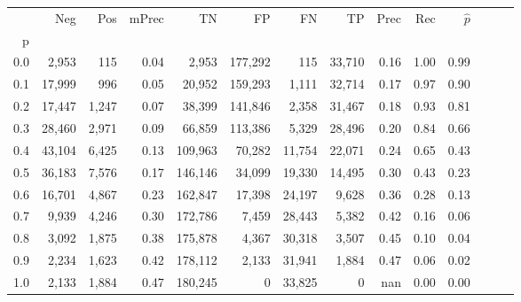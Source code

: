 \begin{tabular}{rrrrrrrrrrrrrr}
\toprule
{} &     Neg &    Pos & mPrec &       TN &       FP &      FN &      TP &  Prec &   Rec & $\hat{p}$ \\
p   &         &        &       &          &          &         &         &       &       &           \\
\midrule
0.0 &   2,953 &    115 &  0.04 &    2,953 &  177,292 &     115 &  33,710 &  0.16 &  1.00 &      0.99 \\
0.1 &  17,999 &    996 &  0.05 &   20,952 &  159,293 &   1,111 &  32,714 &  0.17 &  0.97 &      0.90 \\
0.2 &  17,447 &  1,247 &  0.07 &   38,399 &  141,846 &   2,358 &  31,467 &  0.18 &  0.93 &      0.81 \\
0.3 &  28,460 &  2,971 &  0.09 &   66,859 &  113,386 &   5,329 &  28,496 &  0.20 &  0.84 &      0.66 \\
0.4 &  43,104 &  6,425 &  0.13 &  109,963 &   70,282 &  11,754 &  22,071 &  0.24 &  0.65 &      0.43 \\
0.5 &  36,183 &  7,576 &  0.17 &  146,146 &   34,099 &  19,330 &  14,495 &  0.30 &  0.43 &      0.23 \\
0.6 &  16,701 &  4,867 &  0.23 &  162,847 &   17,398 &  24,197 &   9,628 &  0.36 &  0.28 &      0.13 \\
0.7 &   9,939 &  4,246 &  0.30 &  172,786 &    7,459 &  28,443 &   5,382 &  0.42 &  0.16 &      0.06 \\
0.8 &   3,092 &  1,875 &  0.38 &  175,878 &    4,367 &  30,318 &   3,507 &  0.45 &  0.10 &      0.04 \\
0.9 &   2,234 &  1,623 &  0.42 &  178,112 &    2,133 &  31,941 &   1,884 &  0.47 &  0.06 &      0.02 \\
1.0 &   2,133 &  1,884 &  0.47 &  180,245 &        0 &  33,825 &       0 &   nan &  0.00 &      0.00 \\
\bottomrule
\end{tabular}
